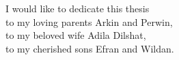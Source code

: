
\begin{dedication} 




\begin{LARGE}
{\fmmfamily I would like to dedicate this thesis \\
to my loving parents Arkin and Perwin, \\
to my beloved wife Adila Dilshat,  \\
to my cherished sons Efran and Wildan.}
\end{LARGE}




\end{dedication}

